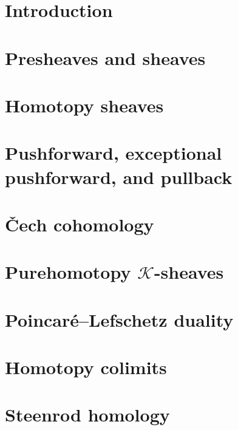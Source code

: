%

\chapter{Introduction}



\chapter{Presheaves and sheaves}



\chapter{Homotopy sheaves}



\chapter{Pushforward, exceptional pushforward, and pullback}



\chapter{\v{C}ech cohomology}



\chapter{Purehomotopy $\mathcal{K}$-sheaves}



\chapter{Poincaré–Lefschetz duality}



\chapter{Homotopy colimits}



\chapter{Steenrod homology}





